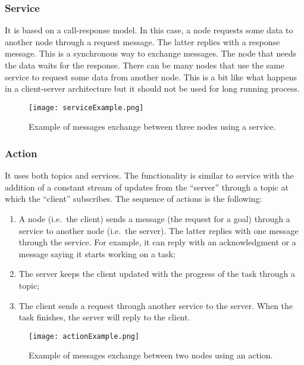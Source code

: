\documentclass[../thesis.tex]{subfiles}
\begin{document}
\subsubsection{Service}
It is based on a call-response model. In this case, a node requests some data to another node through a request message. The latter replies with a response message. This is a synchronous way to exchange messages. The node that needs the data waits for the response. There can be many nodes that use the same service to request some data from another node. This is a bit like what happens in a client-server architecture but it should not be used for long running process.
\begin{figure}[H]
    \centering
    \texttt{[image: serviceExample.png]}
    \caption{Example of messages exchange between three nodes using a service.}
    \label{fig:exampleServiceExchangeMessage}
\end{figure}

\subsubsection{Action}
It uses both topics and services. The functionality is similar to service with the addition of a constant stream of updates from the ``server'' through a topic at which the ``client'' subscribes. The sequence of actions is the following:
    \begin{enumerate}
        \item A node (i.e.\ the client) sends a message (the request for a goal) through a service to another node (i.e.\ the server). The latter replies with one message through the service. For example, it can reply with an acknowledgment or a message saying it starts working on a task;
        \item The server keeps the client updated with the progress of the task through a topic;
        \item The client sends a request through another service to the server. When the task finishes, the server will reply to the client.
    \end{enumerate}
\begin{figure}[H]
    \centering
    \texttt{[image: actionExample.png]}
    \caption{Example of messages exchange between two nodes using an action.}
    \label{fig:exampleActionExchangeMessage}
\end{figure}
\end{document}
